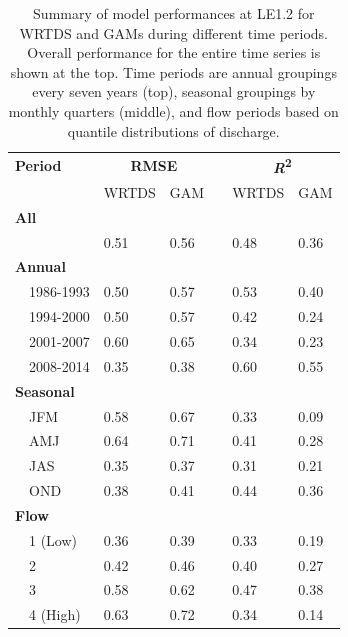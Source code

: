 \documentclass[letterpaper,12pt,oneside]{article}\usepackage[]{graphicx}\usepackage[]{color}
\begin{document}
\begin{table}[!tbp]
\caption{Summary of model performances at LE1.2 for \ac{WRTDS} and \acp{GAM} during different time periods.  Overall performance for the entire time series is shown at the top.  Time periods are annual groupings every seven years (top), seasonal groupings by monthly quarters (middle), and flow periods based on quantile distributions of discharge.\label{tab:perfLE12}} 
\begin{center}
\begin{tabular}{lllcll}
\hline\hline
\multicolumn{1}{l}{\bfseries Period}&\multicolumn{2}{c}{\bfseries RMSE}&\multicolumn{1}{c}{\bfseries }&\multicolumn{2}{c}{\bfseries {\bf \textit{R}\textsuperscript{2}}}\tabularnewline
\cline{2-3} \cline{5-6}
\multicolumn{1}{l}{}&\multicolumn{1}{c}{WRTDS}&\multicolumn{1}{c}{GAM}&\multicolumn{1}{c}{}&\multicolumn{1}{c}{WRTDS}&\multicolumn{1}{c}{GAM}\tabularnewline
\hline
{\bfseries All}&&&&&\tabularnewline
~~&0.51&0.56&&0.48&0.36\tabularnewline
\hline
{\bfseries Annual}&&&&&\tabularnewline
~~1986-1993&0.50&0.57&&0.53&0.40\tabularnewline
~~1994-2000&0.50&0.57&&0.42&0.24\tabularnewline
~~2001-2007&0.60&0.65&&0.34&0.23\tabularnewline
~~2008-2014&0.35&0.38&&0.60&0.55\tabularnewline
\hline
{\bfseries Seasonal}&&&&&\tabularnewline
~~JFM&0.58&0.67&&0.33&0.09\tabularnewline
~~AMJ&0.64&0.71&&0.41&0.28\tabularnewline
~~JAS&0.35&0.37&&0.31&0.21\tabularnewline
~~OND&0.38&0.41&&0.44&0.36\tabularnewline
\hline
{\bfseries Flow}&&&&&\tabularnewline
~~1 (Low)&0.36&0.39&&0.33&0.19\tabularnewline
~~2&0.42&0.46&&0.40&0.27\tabularnewline
~~3&0.58&0.62&&0.47&0.38\tabularnewline
~~4 (High)&0.63&0.72&&0.34&0.14\tabularnewline
\hline
\end{tabular}\end{center}

\end{table}
\end{document}
